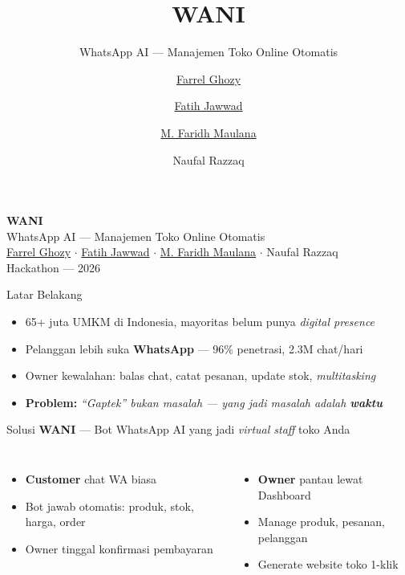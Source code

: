 \documentclass[aspectratio=169,12pt]{beamer}
\title{WANI}
\subtitle{WhatsApp AI — Manajemen Toko Online Otomatis}
\author{\href{https://github.com/FarrelGhozy}{Farrel Ghozy} \and \href{https://github.com/jaweed3}{Fatih Jawwad} \and \href{https://github.com/MowlandCodes}{M. Faridh Maulana} \and Naufal Razzaq}
\date{}
\begin{document}
\begin{frame}
  \centering
  \vspace{2cm}
  {\fontsize{36}{44}\selectfont\bfseries WANI}
  \\[8pt]
  {\fontsize{18}{22}\selectfont WhatsApp AI --- Manajemen Toko Online Otomatis}
  \\[24pt]
  {\fontsize{13}{16}\selectfont
    \href{https://github.com/FarrelGhozy}{Farrel Ghozy} $\cdot$
    \href{https://github.com/jaweed3}{Fatih Jawwad} $\cdot$
    \href{https://github.com/MowlandCodes}{M. Faridh Maulana} $\cdot$
    Naufal Razzaq
  }
  \\[6pt]
  {\fontsize{11}{14}\selectfont\color{gray} Hackathon --- 2026}
  \vfill
\end{frame}

\begin{frame}{Latar Belakang}
  \begin{itemize}
    \item 65+ juta UMKM di Indonesia, mayoritas belum punya \emph{digital presence}
    \item Pelanggan lebih suka \textbf{WhatsApp} --- 96\% penetrasi, 2.3M chat/hari
    \item Owner kewalahan: balas chat, catat pesanan, update stok, \emph{multitasking}
    \pause
    \item \textbf{Problem:} \emph{``Gaptek'' bukan masalah --- yang jadi masalah adalah \textbf{waktu}}
  \end{itemize}
\end{frame}

\begin{frame}{Solusi}
  \centering
  \textbf{WANI} --- Bot WhatsApp AI yang jadi \emph{virtual staff} toko Anda
  \vspace{12pt}

  \begin{columns}[T]
    \begin{itemize}
      \item \textbf{Customer} chat WA biasa
      \item Bot jawab otomatis: produk, stok, harga, order
      \item Owner tinggal konfirmasi pembayaran
    \end{itemize}

    \begin{itemize}
      \item \textbf{Owner} pantau lewat Dashboard
      \item Manage produk, pesanan, pelanggan
      \item Generate website toko 1-klik
    \end{itemize}
  \end{columns}
\end{frame}
\end{document}

